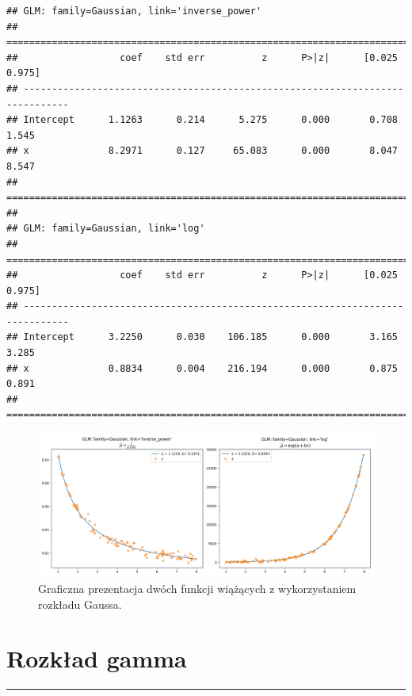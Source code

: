 \documentclass[polish,]{book}
\begin{document}
\begin{verbatim}
## GLM: family=Gaussian, link='inverse_power'
## ==============================================================================
##                  coef    std err          z      P>|z|      [0.025      0.975]
## ------------------------------------------------------------------------------
## Intercept      1.1263      0.214      5.275      0.000       0.708       1.545
## x              8.2971      0.127     65.083      0.000       8.047       8.547
## ==============================================================================
## 
## GLM: family=Gaussian, link='log'
## ==============================================================================
##                  coef    std err          z      P>|z|      [0.025      0.975]
## ------------------------------------------------------------------------------
## Intercept      3.2250      0.030    106.185      0.000       3.165       3.285
## x              0.8834      0.004    216.194      0.000       0.875       0.891
## ==============================================================================
\end{verbatim}

\begin{figure}[h]

{\centering \includegraphics[width=1\linewidth]{modlin02} 

}

\caption{Graficzna prezentacja dwóch funkcji wiążących z wykorzystaniem rozkładu Gaussa.}\label{fig:modlin02}
\end{figure}

\hypertarget{R3}{%
\chapter{Rozkład gamma}\label{R3}}

\begin{center}\rule{0.5\linewidth}{\linethickness}\end{center}
\end{document}
